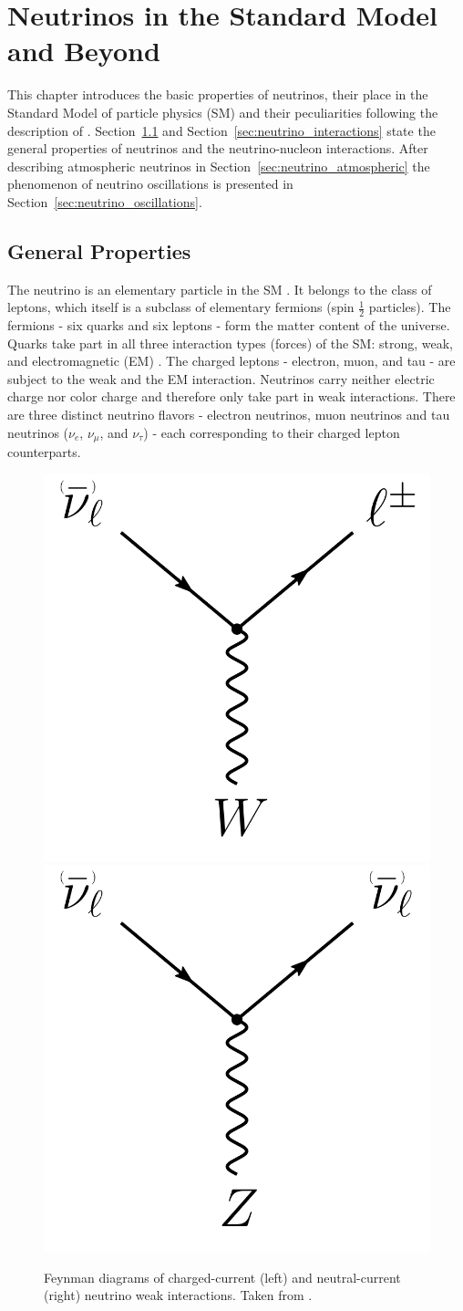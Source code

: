 \chapter{Neutrinos in the Standard Model and Beyond} \label{chap:theoretical_background}

This chapter introduces the basic properties of neutrinos, their place in the Standard Model of particle physics (SM) and their peculiarities following the description of \cite{Thomson_Particle}.
Section~\ref{sec:neutrino_properties} and Section~\ref{sec:neutrino_interactions} state the general properties of neutrinos and the neutrino-nucleon interactions.
After describing atmospheric neutrinos in Section~\ref{sec:neutrino_atmospheric} the phenomenon of neutrino oscillations is presented in Section~\ref{sec:neutrino_oscillations}.


\section{General Properties} \label{sec:neutrino_properties}

The neutrino is an elementary particle in the SM \cite{Thomson_Particle}.
It belongs to the class of leptons, which itself is a subclass of elementary fermions (spin ${\frac{1}{2}}$ particles).
The fermions - six quarks and six leptons - form the matter content of the universe.
Quarks take part in all three interaction types (forces) of the SM: strong, weak, and electromagnetic (EM) \cite{GLASHOW1961579}.
The charged leptons - electron, muon, and tau - are subject to the weak and the EM interaction.
Neutrinos carry neither electric charge nor color charge and therefore only take part in weak interactions.
There are three distinct neutrino flavors - electron neutrinos, muon neutrinos and tau neutrinos ($\nu_e$, $\nu_{\mu}$, and $\nu_{\tau}$) \cite{PhysRevD.98.030001} - each corresponding to their charged lepton counterparts.

\begin{figure}
	\centering
    \includegraphics[width=0.25\linewidth]{figures/feynman_CC_nu.pdf}
    \hspace{1cm}
    \includegraphics[width=0.25\linewidth]{figures/feynman_NC_nu.pdf}
    \caption[Feynman diagrams of neutrino weak interactions, taken from \cite{ATerliuk}]
    {Feynman diagrams of charged-current (left) and neutral-current (right) neutrino weak interactions. Taken from \cite{ATerliuk}.}
    \label{fig:weak_interactions}
\end{figure}

